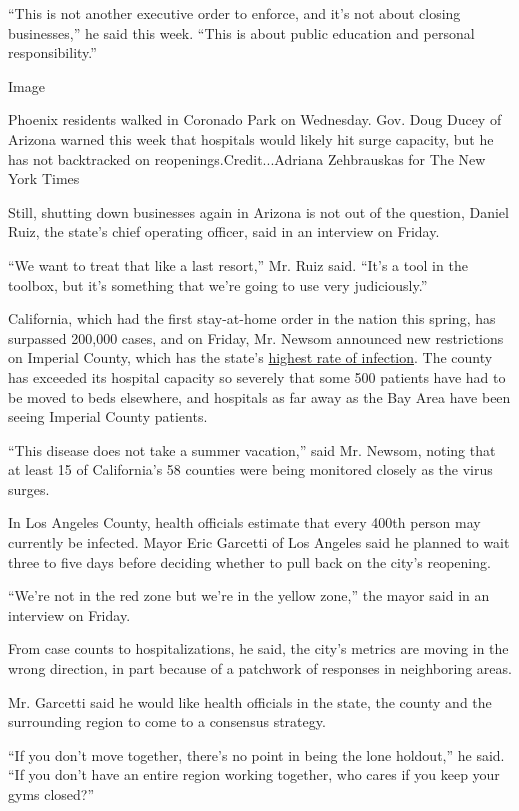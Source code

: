 ``This is not another executive order to enforce, and it's not about
closing businesses,'' he said this week. ``This is about public
education and personal responsibility.''

Image

Phoenix residents walked in Coronado Park on Wednesday. Gov. Doug Ducey
of Arizona warned this week that hospitals would likely hit surge
capacity, but he has not backtracked on reopenings.Credit...Adriana
Zehbrauskas for The New York Times

Still, shutting down businesses again in Arizona is not out of the
question, Daniel Ruiz, the state's chief operating officer, said in an
interview on Friday.

``We want to treat that like a last resort,'' Mr. Ruiz said. ``It's a
tool in the toolbox, but it's something that we're going to use very
judiciously.''

California, which had the first stay-at-home order in the nation this
spring, has surpassed 200,000 cases, and on Friday, Mr. Newsom announced
new restrictions on Imperial County, which has the state's
\href{https://www.nytimes.com/2020/06/26/us/corona-virus-latinos.html}{highest
rate of infection}. The county has exceeded its hospital capacity so
severely that some 500 patients have had to be moved to beds elsewhere,
and hospitals as far away as the Bay Area have been seeing Imperial
County patients.

``This disease does not take a summer vacation,'' said Mr. Newsom,
noting that at least 15 of California's 58 counties were being monitored
closely as the virus surges.

In Los Angeles County, health officials estimate that every 400th person
may currently be infected. Mayor Eric Garcetti of Los Angeles said he
planned to wait three to five days before deciding whether to pull back
on the city's reopening.

``We're not in the red zone but we're in the yellow zone,'' the mayor
said in an interview on Friday.

From case counts to hospitalizations, he said, the city's metrics are
moving in the wrong direction, in part because of a patchwork of
responses in neighboring areas.

Mr. Garcetti said he would like health officials in the state, the
county and the surrounding region to come to a consensus strategy.

``If you don't move together, there's no point in being the lone
holdout,'' he said. ``If you don't have an entire region working
together, who cares if you keep your gyms closed?''

